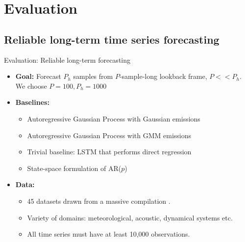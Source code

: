 \documentclass{beamer}
\theoremstyle{definition}
\theoremstyle{remark}
\begin{document}
\section{Evaluation}
\frame{\tableofcontents[currentsection]}
\subsection{Reliable long-term time series forecasting}
\begin{frame}{Evaluation: Reliable long-term forecasting}
    \begin{itemize}
        \item \alert<+>{\textbf{Goal: } Forecast $P_h$ samples from $P$-sample-long lookback frame, $P << P_h$. We choose $P=100, P_h=1000$} \pause 
        \item \alert<+>{\textbf{Baselines: }} \begin{itemize}
            \item \alert<+>{Autoregressive Gaussian Process with Gaussian emissions}
            \item \alert<+>{Autoregressive Gaussian Process with GMM emissions}
            \item \alert<+>{Trivial baseline: LSTM that performs direct regression}
            \item \alert<+>{State-space formulation of AR($p$)} \pause
        \end{itemize}    
        \item \alert<+>{\textbf{Data:}}
        \begin{itemize}
            \item \alert<+>{45 datasets drawn from a massive compilation \citep{Fulcher20130048}.} 
            \item \alert<+>{Variety of domains: meteorological, acoustic, dynamical systems etc.}
            \item \alert<+>{All time series must have at least 10,000 observations.}
        \end{itemize}
        
    \end{itemize}
\end{frame}
\end{document}
